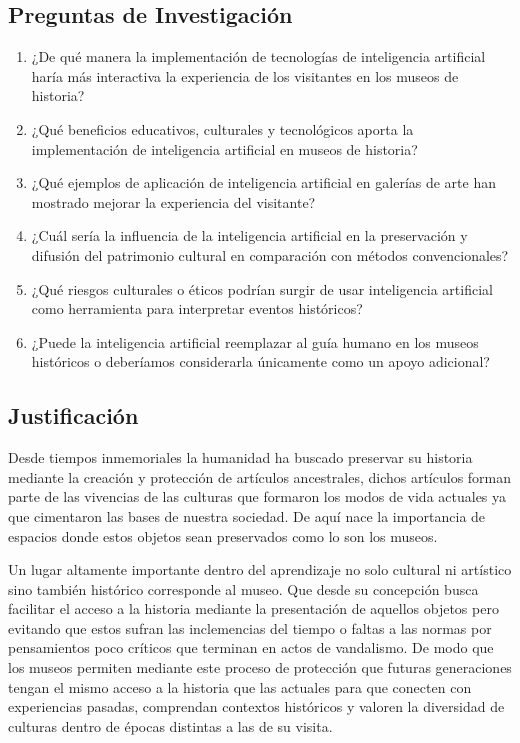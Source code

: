 \documentclass[pdflatex,sn-mathphys-num]{sn-jnl}%
\theoremstyle{thmstyleone}%
\theoremstyle{thmstyletwo}%
\theoremstyle{thmstylethree}%
\begin{document}
\subsection{Preguntas de Investigación}
\begin{enumerate}
    \item ¿De qué manera la implementación de tecnologías de inteligencia artificial haría más interactiva la experiencia de los visitantes en los museos de historia? 

    \item ¿Qué beneficios educativos, culturales y tecnológicos aporta la implementación de inteligencia artificial en museos de historia? 

    \item ¿Qué ejemplos de aplicación de inteligencia artificial en galerías de arte han mostrado mejorar la experiencia del visitante? 

    \item ¿Cuál sería la influencia de la inteligencia artificial en la preservación y difusión del patrimonio cultural en comparación con métodos convencionales? 

    \item ¿Qué riesgos culturales o éticos podrían surgir de usar inteligencia artificial como herramienta para interpretar eventos históricos? 

    \item ¿Puede la inteligencia artificial reemplazar al guía humano en los museos históricos o deberíamos considerarla únicamente como un apoyo adicional? 
\end{enumerate}

\subsection{Justificación}
Desde tiempos inmemoriales la humanidad ha buscado preservar su historia mediante la creación y protección de artículos ancestrales, dichos artículos forman parte de las vivencias de las culturas que formaron los modos de vida actuales ya que cimentaron las bases de nuestra sociedad. De aquí nace la importancia de espacios donde estos objetos sean preservados como lo son los museos.

Un lugar altamente importante dentro del aprendizaje no solo cultural ni artístico sino también histórico corresponde al museo. Que desde su concepción busca facilitar el acceso a la historia mediante la presentación de aquellos objetos pero evitando que estos sufran las inclemencias del tiempo o faltas a las normas por pensamientos poco críticos que terminan en actos de vandalismo. De modo que los museos permiten mediante este proceso de protección que futuras generaciones tengan el mismo acceso a la historia que las actuales para que conecten con experiencias pasadas, comprendan contextos históricos y valoren la diversidad de culturas dentro de épocas distintas a las de su visita.
\end{document}
